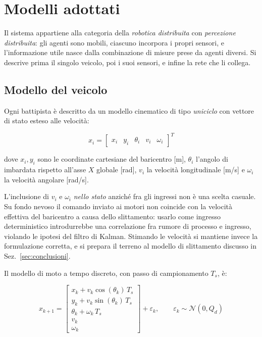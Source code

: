 \documentclass[conference,9pt]{IEEEtran}
\begin{document}
\section{Modelli adottati}
\label{sec:modelli}

Il sistema appartiene alla categoria della \emph{robotica distribuita} con
\emph{percezione distribuita}: gli agenti sono mobili, ciascuno incorpora i
propri sensori, e l'informazione utile nasce dalla combinazione di misure prese
da agenti diversi. Si descrive prima il singolo veicolo, poi i suoi sensori, e
infine la rete che li collega.

\subsection{Modello del veicolo}

Ogni battipista \`e descritto da un modello cinematico di tipo \emph{uniciclo}
con vettore di stato esteso alle velocit\`a:

\begin{equation}
x_i = \begin{bmatrix} x_i & y_i & \theta_i & v_i & \omega_i \end{bmatrix}^T
\label{eq:stato}
\end{equation}

dove $x_i, y_i$ sono le coordinate cartesiane del baricentro [m], $\theta_i$
l'angolo di imbardata rispetto all'asse $X$ globale [rad], $v_i$ la velocit\`a
longitudinale [m/s] e $\omega_i$ la velocit\`a angolare [rad/s].

L'inclusione di $v_i$ e $\omega_i$ \emph{nello stato} anzich\'e fra gli ingressi
non \`e una scelta casuale. Su fondo nevoso il comando inviato ai motori non
coincide con la velocit\`a effettiva del baricentro a causa dello slittamento:
usarlo come ingresso deterministico introdurrebbe una correlazione fra rumore
di processo e ingresso, violando le ipotesi del filtro di Kalman. Stimando le
velocit\`a si mantiene invece la formulazione corretta, e si prepara il terreno
al modello di slittamento discusso in Sez.~\ref{sec:conclusioni}.

Il modello di moto a tempo discreto, con passo di campionamento $T_s$, \`e:

\begin{equation}
x_{k+1} =
\begin{bmatrix}
x_k + v_k \cos(\theta_k)\,T_s\\
y_k + v_k \sin(\theta_k)\,T_s\\
\theta_k + \omega_k\,T_s\\
v_k\\
\omega_k
\end{bmatrix}
+ \varepsilon_k, \qquad \varepsilon_k \sim \mathcal{N}(0, Q_d)
\label{eq:moto}
\end{equation}
\end{document}
